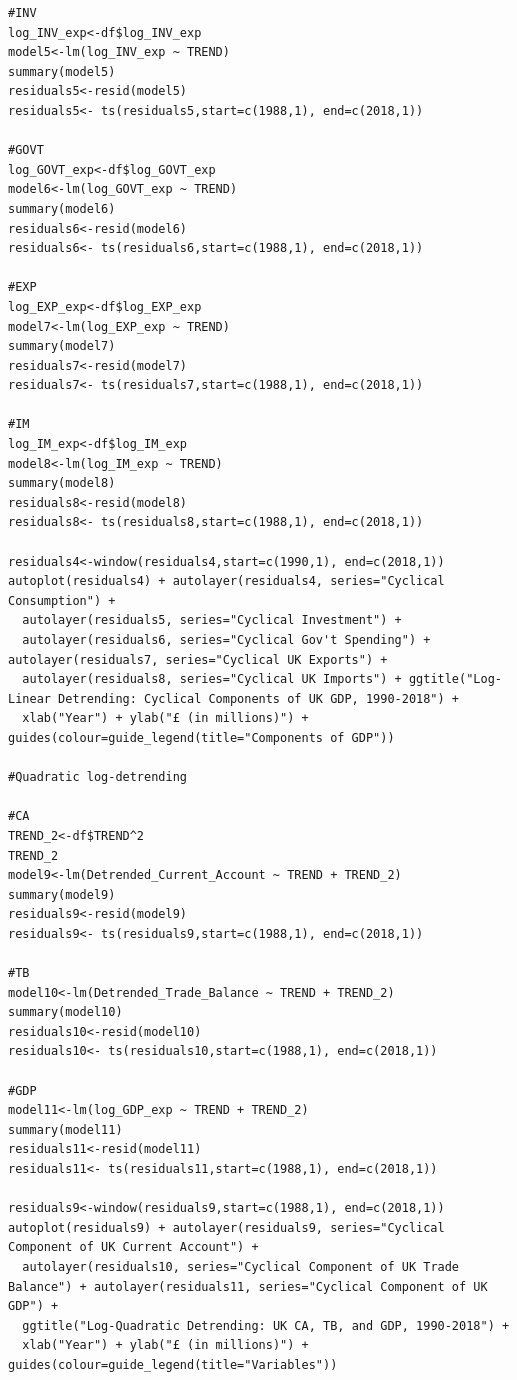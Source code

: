 \documentclass[12pt]{article}
\begin{document}
\begin{verbatim}
#INV
log_INV_exp<-df$log_INV_exp
model5<-lm(log_INV_exp ~ TREND)
summary(model5)
residuals5<-resid(model5)
residuals5<- ts(residuals5,start=c(1988,1), end=c(2018,1))

#GOVT
log_GOVT_exp<-df$log_GOVT_exp
model6<-lm(log_GOVT_exp ~ TREND)
summary(model6)
residuals6<-resid(model6)
residuals6<- ts(residuals6,start=c(1988,1), end=c(2018,1))

#EXP
log_EXP_exp<-df$log_EXP_exp
model7<-lm(log_EXP_exp ~ TREND)
summary(model7)
residuals7<-resid(model7)
residuals7<- ts(residuals7,start=c(1988,1), end=c(2018,1))

#IM
log_IM_exp<-df$log_IM_exp
model8<-lm(log_IM_exp ~ TREND)
summary(model8)
residuals8<-resid(model8)
residuals8<- ts(residuals8,start=c(1988,1), end=c(2018,1))

residuals4<-window(residuals4,start=c(1990,1), end=c(2018,1)) 
autoplot(residuals4) + autolayer(residuals4, series="Cyclical Consumption") + 
  autolayer(residuals5, series="Cyclical Investment") +
  autolayer(residuals6, series="Cyclical Gov't Spending") + autolayer(residuals7, series="Cyclical UK Exports") +
  autolayer(residuals8, series="Cyclical UK Imports") + ggtitle("Log-Linear Detrending: Cyclical Components of UK GDP, 1990-2018") + 
  xlab("Year") + ylab("£ (in millions)") + guides(colour=guide_legend(title="Components of GDP"))

#Quadratic log-detrending

#CA
TREND_2<-df$TREND^2
TREND_2
model9<-lm(Detrended_Current_Account ~ TREND + TREND_2)
summary(model9)
residuals9<-resid(model9)
residuals9<- ts(residuals9,start=c(1988,1), end=c(2018,1))

#TB
model10<-lm(Detrended_Trade_Balance ~ TREND + TREND_2)
summary(model10)
residuals10<-resid(model10)
residuals10<- ts(residuals10,start=c(1988,1), end=c(2018,1))

#GDP
model11<-lm(log_GDP_exp ~ TREND + TREND_2)
summary(model11)
residuals11<-resid(model11)
residuals11<- ts(residuals11,start=c(1988,1), end=c(2018,1))

residuals9<-window(residuals9,start=c(1988,1), end=c(2018,1)) 
autoplot(residuals9) + autolayer(residuals9, series="Cyclical Component of UK Current Account") +
  autolayer(residuals10, series="Cyclical Component of UK Trade Balance") + autolayer(residuals11, series="Cyclical Component of UK GDP") +
  ggtitle("Log-Quadratic Detrending: UK CA, TB, and GDP, 1990-2018") + 
  xlab("Year") + ylab("£ (in millions)") + guides(colour=guide_legend(title="Variables"))


\end{verbatim}
\end{document}
